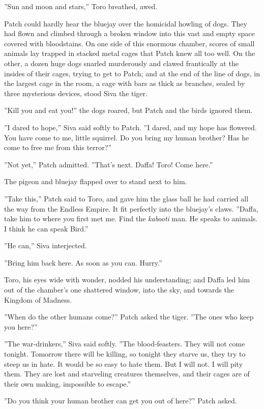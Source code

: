 \documentclass[12pt]{book}
\begin{document}
 ''Sun and moon and stars,'' Toro breathed, awed.\par
 Patch could hardly hear the bluejay over the homicidal howling of dogs. They had flown and climbed through a broken window into this vast and empty space covered with bloodstains. On one side of this enormous chamber, scores of small animals lay trapped in stacked metal cages that Patch knew all too well. On the other, a dozen huge dogs snarled murderously and clawed frantically at the insides of their cages, trying to get to Patch; and at the end of the line of dogs, in the largest cage in the room, a cage with bars as thick as branches, sealed by three mysterious devices, stood Siva the tiger.\par
 ''Kill you and eat you!'' the dogs roared, but Patch and the birds ignored them.\par
 ''I dared to hope,'' Siva said softly to Patch. ''I dared, and my hope has flowered. You have come to me, little squirrel. Do you bring my human brother? Has he come to free me from this terror?''\par
 ''Not yet,'' Patch admitted. ''That's next. Daffa! Toro! Come here.''\par
 The pigeon and bluejay flapped over to stand next to him.\par
 ''Take this,'' Patch said to Toro, and gave him the glass ball he had carried all the way from the Endless Empire. It fit perfectly into the bluejay's claws. ''Daffa, take him to where you first met me. Find the {\it kabooti} man. He speaks to animals. I think he can speak Bird.''\par
 ''He can,'' Siva interjected.\par
 ''Bring him back here. As soon as you can. Hurry.''\par
 Toro, his eyes wide with wonder, nodded his understanding; and Daffa led him out of the chamber's one shattered window, into the sky, and towards the Kingdom of Madness.\par
 ''When do the other humans come?'' Patch asked the tiger. ''The ones who keep you here?''\par
 ''The war-drinkers,'' Siva said softly. ''The blood-feasters. They will not come tonight. Tomorrow there will be killing, so tonight they starve us, they try to steep us in hate. It would be so easy to hate them. But I will not. I will pity them. They are lost and starveling creatures themselves, and their cages are of their own making, impossible to escape.''\par
 ''Do you think your human brother can get you out of here?'' Patch asked.\par
\end{document}

